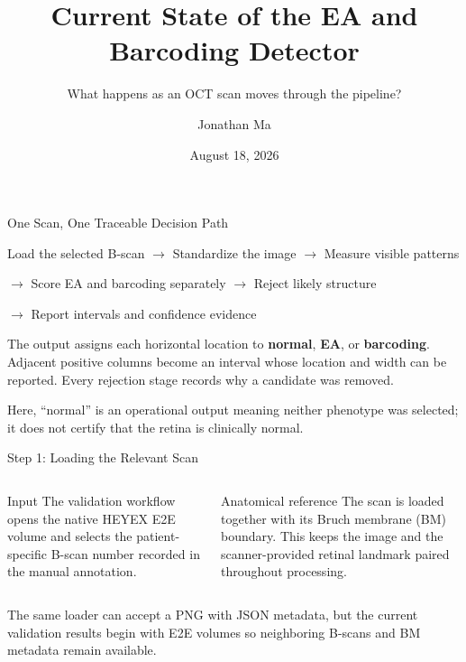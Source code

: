 \documentclass[aspectratio=169]{beamer}
\title{Current State of the EA and Barcoding Detector}
\subtitle{What happens as an OCT scan moves through the pipeline?}
\author{Jonathan Ma}
\institute{Johns Hopkins University}
\date{August 18, 2026}
\newcommand{\EA}{\textcolor{eacolor}{\textbf{EA}}}
\newcommand{\Barcode}{\textcolor{barcodecolor}{\textbf{barcoding}}}
\newcommand{\Normal}{\textcolor{normalcolor}{\textbf{normal}}}
\begin{document}
\begin{frame}
    \titlepage
\end{frame}

\begin{frame}{One Scan, One Traceable Decision Path}

\begin{center}
\large
\textcolor{mutedblue}{Load the selected B-scan}
$\longrightarrow$
\textcolor{mutedblue}{Standardize the image}
$\longrightarrow$
\textcolor{mutedblue}{Measure visible patterns}

\vspace{0.35cm}

$\longrightarrow$
\textcolor{mutedblue}{Score EA and barcoding separately}
$\longrightarrow$
\textcolor{mutedblue}{Reject likely structure}

\vspace{0.35cm}

$\longrightarrow$
\textcolor{mutedblue}{Report intervals and confidence evidence}
\end{center}

\vspace{0.4cm}

The output assigns each horizontal location to \Normal, \EA, or \Barcode.
Adjacent positive columns become an interval whose location and width can be
reported. Every rejection stage records why a candidate was removed.

\vspace{0.2cm}
\small Here, ``normal'' is an operational output meaning neither phenotype was
selected; it does not certify that the retina is clinically normal.

\end{frame}

\begin{frame}{Step 1: Loading the Relevant Scan}

\begin{columns}[T]
\begin{block}{Input}
The validation workflow opens the native HEYEX E2E volume and selects the
patient-specific B-scan number recorded in the manual annotation.
\end{block}

\begin{block}{Anatomical reference}
The scan is loaded together with its Bruch membrane (BM) boundary. This keeps
the image and the scanner-provided retinal landmark paired throughout
processing.
\end{block}
\end{columns}

\vspace{0.5cm}

The same loader can accept a PNG with JSON metadata, but the current validation
results begin with E2E volumes so neighboring B-scans and BM metadata remain
available.

\end{frame}
\end{document}
